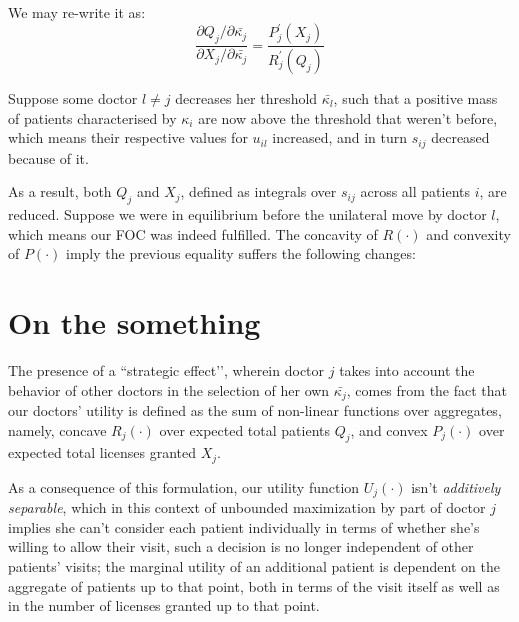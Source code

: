 \documentclass{article}
\begin{document}
We may re-write it as:
\begin{equation*}
\frac{\partial Q_j/\partial\bar{\kappa_j}}{\partial X_j/\partial \bar{\kappa_j}}  = \frac{P_j^{\prime}(X_j)}{R_j^{\prime}(Q_j)}
\end{equation*}

Suppose some doctor $l \neq j$ decreases her threshold $\bar{\kappa_{l}}$, such that a positive mass of patients characterised by $\kappa_i$ are now above the threshold that weren’t before, which means their respective values for $u_{il}$ increased, and in turn $s_{ij}$ decreased because of it.

As a result, both $Q_j$ and $X_j$, defined as integrals over $s_{ij}$ across all patients $i$, are reduced. Suppose we were in equilibrium before the unilateral move by doctor $l$, which means our FOC was indeed fulfilled. The concavity of $R(\cdot)$ and convexity of $P(\cdot)$ imply the previous equality suffers the following changes:


\section{On the something}

The presence of a ``strategic effect’’, wherein doctor $j$ takes into account the behavior of other doctors in the selection of her own $\bar{\kappa_j}$, comes from the fact that our doctors’ utility is defined as the sum of non-linear functions over aggregates, namely, concave $R_j(\cdot)$ over expected total patients $Q_j$, and convex $P_j(\cdot)$ over expected total licenses granted $X_j$.

As a consequence of this formulation, our utility function $U_j(\cdot)$ isn’t \textit{additively separable}, which in this context of unbounded maximization by part of doctor $j$ implies she can’t consider each patient individually in terms of whether she’s willing to allow their visit, such a decision is no longer independent of other patients’ visits; the marginal utility of an additional patient is dependent on the aggregate of patients up to that point, both in terms of the visit itself as well as in the number of licenses granted up to that point.
\end{document}
